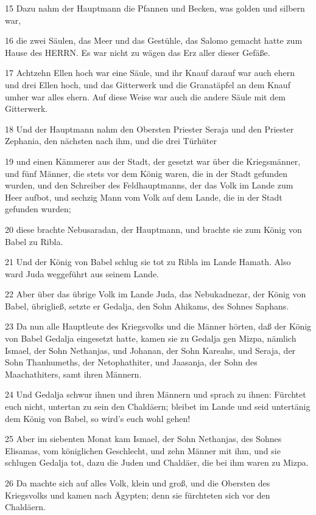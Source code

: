 \par 15 Dazu nahm der Hauptmann die Pfannen und Becken, was golden und silbern war,
\par 16 die zwei Säulen, das Meer und das Gestühle, das Salomo gemacht hatte zum Hause des HERRN. Es war nicht zu wägen das Erz aller dieser Gefäße.
\par 17 Achtzehn Ellen hoch war eine Säule, und ihr Knauf darauf war auch ehern und drei Ellen hoch, und das Gitterwerk und die Granatäpfel an dem Knauf umher war alles ehern. Auf diese Weise war auch die andere Säule mit dem Gitterwerk.
\par 18 Und der Hauptmann nahm den Obersten Priester Seraja und den Priester Zephania, den nächsten nach ihm, und die drei Türhüter
\par 19 und einen Kämmerer aus der Stadt, der gesetzt war über die Kriegsmänner, und fünf Männer, die stets vor dem König waren, die in der Stadt gefunden wurden, und den Schreiber des Feldhauptmanns, der das Volk im Lande zum Heer aufbot, und sechzig Mann vom Volk auf dem Lande, die in der Stadt gefunden wurden;
\par 20 diese brachte Nebusaradan, der Hauptmann, und brachte sie zum König von Babel zu Ribla.
\par 21 Und der König von Babel schlug sie tot zu Ribla im Lande Hamath. Also ward Juda weggeführt aus seinem Lande.
\par 22 Aber über das übrige Volk im Lande Juda, das Nebukadnezar, der König von Babel, übrigließ, setzte er Gedalja, den Sohn Ahikams, des Sohnes Saphans.
\par 23 Da nun alle Hauptleute des Kriegsvolks und die Männer hörten, daß der König von Babel Gedalja eingesetzt hatte, kamen sie zu Gedalja gen Mizpa, nämlich Ismael, der Sohn Nethanjas, und Johanan, der Sohn Kareahs, und Seraja, der Sohn Thanhumeths, der Netophathiter, und Jaasanja, der Sohn des Maachathiters, samt ihren Männern.
\par 24 Und Gedalja schwur ihnen und ihren Männern und sprach zu ihnen: Fürchtet euch nicht, untertan zu sein den Chaldäern; bleibet im Lande und seid untertänig dem König von Babel, so wird's euch wohl gehen!
\par 25 Aber im siebenten Monat kam Ismael, der Sohn Nethanjas, des Sohnes Elisamas, vom königlichen Geschlecht, und zehn Männer mit ihm, und sie schlugen Gedalja tot, dazu die Juden und Chaldäer, die bei ihm waren zu Mizpa.
\par 26 Da machte sich auf alles Volk, klein und groß, und die Obersten des Kriegsvolks und kamen nach Ägypten; denn sie fürchteten sich vor den Chaldäern.

